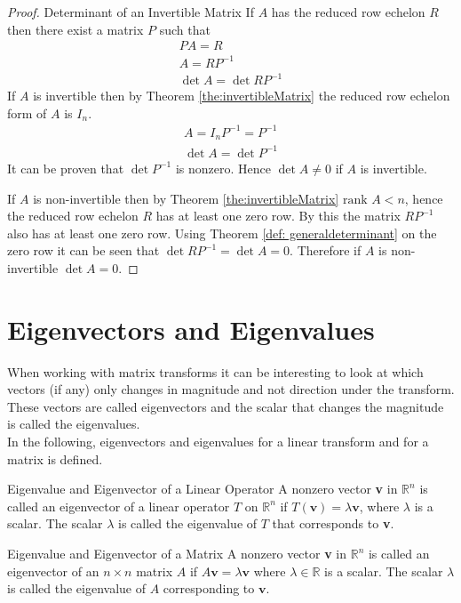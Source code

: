 \begin{proof}{Determinant of an Invertible Matrix}
    If $A$ has the reduced row echelon $R$ then there exist a matrix $P$ such that
    \begin{align*}
        PA=R \\
        A=RP^{-1} \\
        \det A = \det RP^{-1}
    \end{align*}
    If $A$ is invertible then by Theorem \ref{the:invertibleMatrix}  the reduced row echelon form of $A$ is $I_n$. 
    \begin{align*}
        A=I_nP^{-1}=P^{-1} \\
        \det A = \det P^{-1}
    \end{align*}
    It can be proven that $\det P^{-1}$ is nonzero. Hence $\det A \neq 0$ if $A$ is invertible.
    
    If $A$ is non-invertible then by Theorem \ref{the:invertibleMatrix} $\text{rank } A < n$, hence the reduced row echelon $R$ has at least one zero row. By this the matrix $RP^{-1}$ also has at least one zero row. Using Theorem \ref{def: generaldeterminant} on the zero row it can be seen that $\det RP^{-1}=\det A=0$. Therefore if $A$ is non-invertible $\det A = 0$. \qedsymbol
\end{proof}

\section{Eigenvectors and Eigenvalues}
When working with matrix transforms it can be interesting to look at which vectors (if any) only changes in magnitude and not direction under the transform. These vectors are called eigenvectors and the scalar that changes the magnitude is called the eigenvalues.
\\ 
In the following, eigenvectors and eigenvalues for a linear transform and for a matrix is defined.

\begin{definition}{Eigenvalue and Eigenvector of a Linear Operator}
A nonzero vector \textbf{v} in $\mathbb{R}^n$ is called an eigenvector of a linear operator $T$ on $\mathbb{R}^n$ if $T(\textbf{v})=\lambda\textbf{v}$, where $\lambda$ is a scalar. The scalar $\lambda$ is called the eigenvalue of $T$ that corresponds to \textbf{v}. 
\end{definition}

\begin{definition}{Eigenvalue and Eigenvector of a Matrix}
A nonzero vector \textbf{v} in $\mathbb{R}^n$ is called an eigenvector of an $n \times n$ matrix $A$ if $A\textbf{v}=\lambda\textbf{v}$ where $\lambda \in \mathbb{R}$ is a scalar. The scalar $\lambda$ is called the eigenvalue of $A$ corresponding to $\textbf{v}$.
\label{def:Eigenvalue_and_Eigenvector_of_a Matrix}
\end{definition}

